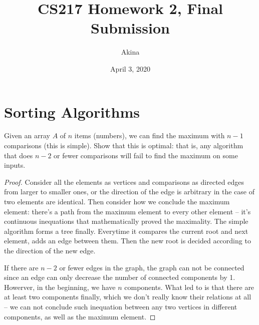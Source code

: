 \documentclass[11pt,a4paper,oneside]{article}
\renewcommand{\hwtitle} {CS217 Homework 2, Final Submission}
\renewcommand{\hwauthor}{Akina}
\renewcommand{\hwdate}{April 3, 2020}
\begin{document}
\title{\hwtitle}
\author{\hwauthor}
\date{\hwdate}
\maketitle

\section*{Sorting Algorithms}
\begin{problem}{1}
	\statement
	Given an array $A$ of $n$ items (numbers), we can find the maximum with $n-1$ comparisons (this is simple).
	Show that this is optimal: that is, any algorithm that does $n-2$ or fewer comparisons will fail to find the maximum 
	on some inputs.
	\solution
	\begin{proof}
		Consider all the elements as vertices and comparisons as directed edges from larger to smaller ones, or the direction of the edge is arbitrary in the case of two elements are identical. Then consider how we conclude the maximum element: there's a path from the maximum element to every other element -- it's continuous inequations that mathematically proved the maximality.
		The simple algorithm forms a tree finally. Everytime it compares the current root and next element, adds an edge between them. Then the new root is decided according to the direction of the new edge.

		If there are $n - 2$ or fewer edges in the graph, the graph can not be connected since an edge can only decrease the number of connected components by 1. Howerver, in the beginning, we have $n$ components. What led to is that there are at least two components finally, which we don't really know their relations at all -- we can not conclude such inequation between any two vertices in different components, as well as the maximum element.
	\end{proof}
\end{problem}
\end{document}
